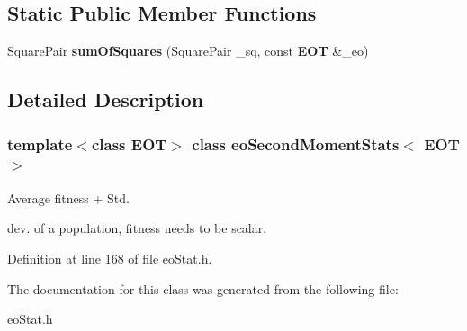 \subsection*{Static Public Member Functions}
\begin{CompactItemize}
\item 
Square\-Pair {\bf sum\-Of\-Squares} (Square\-Pair \_\-sq, const {\bf EOT} \&\_\-eo)\label{classeo_second_moment_stats_e0}

\end{CompactItemize}


\subsection{Detailed Description}
\subsubsection*{template$<$class EOT$>$ class eo\-Second\-Moment\-Stats$<$ EOT $>$}

Average fitness + Std. 

dev. of a population, fitness needs to be scalar. 



Definition at line 168 of file eo\-Stat.h.

The documentation for this class was generated from the following file:\begin{CompactItemize}
\item 
eo\-Stat.h\end{CompactItemize}
